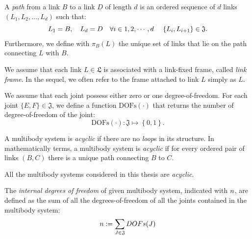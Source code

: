 \begin{definition}[Path]
A \emph{path} from a link $B$ to a link $D$ of length $d$ is an ordered sequence of $d$ links $(L_1,L_2,\dots,L_d)$ such that: 
\begin{equation}
L_1 = B, \quad L_d = D \quad \forall i \in 1,2,\cdots,d \ \hspace{1em}  \{L_i,L_{i+1}\} \in \mathfrak{J}.
\end{equation}
Furthermore, we define with $\pi_B(L)$ the unique set of links that lie on the path connecting $L$ with $B$.
\end{definition}

\begin{assumption}
We assume that each link $L \in \mathfrak{L}$ is associated with a link-fixed frame, called \emph{link frame}. In the sequel, we  often refer to the frame attached to link $L$ simply as $L$.
\end{assumption}


\begin{assumption}
We assume that each joint possess either zero or one degree-of-freedom. For each joint $\{E,F\} \in \mathfrak{J}$, we define a function $\text{DOFs}(\cdot)$ that returns the number of degree-of-freedom of the joint:
$$
\text{DOFs}(\cdot) : \mathfrak{J} \mapsto \left\{ 0,1 \right\} .
$$
\end{assumption}

\begin{definition}
A multibody system is \emph{acyclic} if there are no \emph{loop}s in its structure. In mathematically terms, a multibody system is \emph{acyclic} if for every ordered pair of links $(B,C)$ there is a unique path connecting $B$ to $C$. 
\end{definition}

\begin{assumption}
All the multibody systems considered in this thesis are \emph{acyclic}. 
\end{assumption}

\begin{definition}
The \emph{internal degrees of freedom} of given multibody system, indicated with $n$, are defined as the sum of all the degrees-of-freedom of all the joints contained in the multibody system:
\begin{equation}
n := \sum_{J \in \mathfrak{J}} DOFs(J)
\end{equation}

\end{definition}

